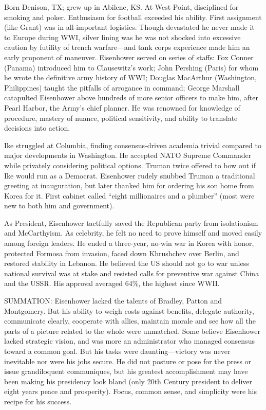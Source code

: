 \documentclass[
]{article}
\begin{document}
Born Denison, TX; grew up in Abilene, KS. At West Point, disciplined for
smoking and poker. Enthusiasm for football exceeded his ability. First
assignment (like Grant) was in all-important logistics. Though
devastated he never made it to Europe during WWI, silver lining was he
was not shocked into excessive caution by futility of trench
warfare---and tank corps experience made him an early proponent of
maneuver. Eisenhower served on series of staffs: Fox Conner (Panama)
introduced him to Clausewitz's work; John Pershing (Paris) for whom he
wrote the definitive army history of WWI; Douglas MacArthur (Washington,
Philippines) taught the pitfalls of arrogance in command; George
Marshall catapulted Eisenhower above hundreds of more senior officers to
make him, after Pearl Harbor, the Army's chief planner. He was renowned
for knowledge of procedure, mastery of nuance, political sensitivity,
and ability to translate decisions into action.

Ike struggled at Columbia, finding consensus-driven academia trivial
compared to major developments in Washington. He accepted NATO Supreme
Commander while privately considering political options. Truman twice
offered to bow out if Ike would run as a Democrat. Eisenhower rudely
snubbed Truman a traditional greeting at inauguration, but later thanked
him for ordering his son home from Korea for it. First cabinet called
``eight millionaires and a plumber'' (most were new to both him and
government).

As President, Eisenhower tactfully saved the Republican party from
isolationism and McCarthyism. As celebrity, he felt no need to prove
himself and moved easily among foreign leaders. He ended a three-year,
no-win war in Korea with honor, protected Formosa from invasion, faced
down Khrushchev over Berlin, and restored stability in Lebanon. He
believed the US should not go to war unless national survival was at
stake and resisted calls for preventive war against China and the USSR.
His approval averaged 64\%, the highest since WWII.

SUMMATION: Eisenhower lacked the talents of Bradley, Patton and
Montgomery. But his ability to weigh costs against benefits, delegate
authority, communicate clearly, cooperate with allies, maintain morale
and see how all the parts of a picture related to the whole were
unmatched. Some believe Eisenhower lacked strategic vision, and was more
an administrator who managed consensus toward a common goal. But his
tasks were daunting---victory was never inevitable nor were his jobs
secure. He did not posture or pose for the press or issue grandiloquent
communiques, but his greatest accomplishment may have been making his
presidency look bland (only 20th Century president to deliver eight
years peace and prosperity). Focus, common sense, and simplicity were
his recipe for his success.
\end{document}
